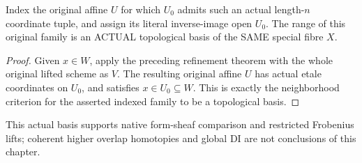 \begin{theorem}
\label{thm:witt-two-special-fibre-lifted-etale-basis}
\leanok
Index the original affine $U$ for which $U_0$ admits such an
actual length-$n$ coordinate tuple, and assign its literal
inverse-image open $U_0$. The range of this original family is
an ACTUAL topological basis of the SAME special fibre $X$.
\end{theorem}
\begin{proof}
Given $x\in W$, apply the preceding refinement theorem with the
whole original lifted scheme as $V$. The resulting original
affine $U$ has actual etale coordinates on $U_0$, and satisfies
$x\in U_0\subseteq W$. This is exactly the neighborhood criterion
for the asserted indexed family to be a topological basis.
\end{proof}

This actual basis supports native form-sheaf comparison and
restricted Frobenius lifts; coherent higher overlap homotopies
and global DI are not conclusions of this chapter.
